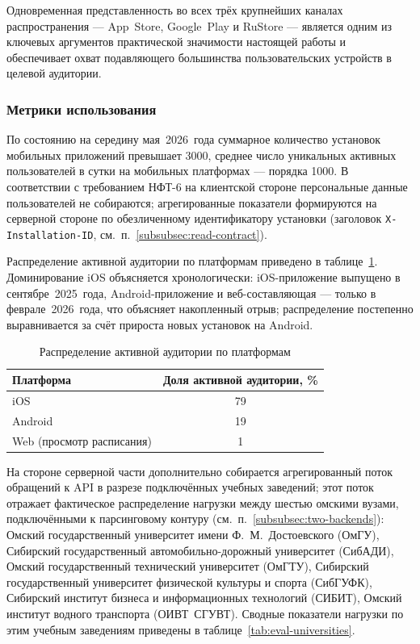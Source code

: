 Одновременная представленность во всех трёх крупнейших каналах распространения --- App~Store, Google~Play и RuStore --- является одним из ключевых аргументов практической значимости настоящей работы и обеспечивает охват подавляющего большинства пользовательских устройств в целевой аудитории.

\subsubsection{Метрики использования}
\label{subsubsec:impl-eval-metrics}

По состоянию на середину мая~2026~года суммарное количество установок мобильных приложений превышает 3000, среднее число уникальных активных пользователей в сутки на мобильных платформах --- порядка 1000. В соответствии с требованием НФТ-6 на клиентской стороне персональные данные пользователей не собираются; агрегированные показатели формируются на серверной стороне по обезличенному идентификатору установки (заголовок \texttt{X-Installation-ID}, см.~п.~\ref{subsubsec:read-contract}).

Распределение активной аудитории по платформам приведено в таблице~\ref{tab:eval-platforms}. Доминирование iOS объясняется хронологически: iOS-приложение выпущено в сентябре~2025~года, Android-приложение и веб-составляющая --- только в феврале~2026~года, что объясняет накопленный отрыв; распределение постепенно выравнивается за счёт прироста новых установок на Android.

\begin{table}[h]
  \caption{Распределение активной аудитории по платформам}
  \label{tab:eval-platforms}
  \centering
  \small
  \begin{tabular}{p{} c}
    \toprule
    Платформа & Доля активной аудитории, \% \\
    \midrule
    iOS               & 79 \\
    Android           & 19 \\
    Web (просмотр расписания) & 1 \\
    \bottomrule
  \end{tabular}
\end{table}

На стороне серверной части дополнительно собирается агрегированный поток обращений к API в разрезе подключённых учебных заведений; этот поток отражает фактическое распределение нагрузки между шестью омскими вузами, подключёнными к парсинговому контуру (см.~п.~\ref{subsubsec:two-backends}): Омский государственный университет имени Ф.~М.~Достоевского (ОмГУ), Сибирский государственный автомобильно-дорожный университет (СибАДИ), Омский государственный технический университет (ОмГТУ), Сибирский государственный университет физической культуры и спорта (СибГУФК), Сибирский институт бизнеса и информационных технологий (СИБИТ), Омский институт водного транспорта (ОИВТ~СГУВТ). Сводные показатели нагрузки по этим учебным заведениям приведены в таблице~\ref{tab:eval-universities}.

